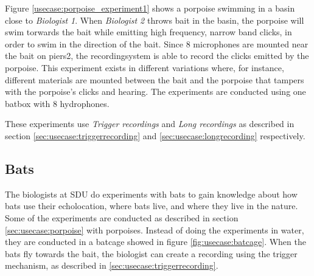 Figure \ref{usecase:porpoise_experiment1} shows a porpoise swimming in a basin close to \textit{Biologist 1}. 
When \textit{Biologist 2} throws bait in the basin, the porpoise will swim torwards the bait while emitting high frequency, narrow band clicks, in order to swim in the direction of the bait.
Since 8 microphones are mounted near the bait on piers2, the recordingsystem is able to record the clicks emitted by the porpoise. This experiment exists in different variations where, for instance, different materials are mounted between the bait and the porpoise that tampers with the porpoise's clicks and hearing. The experiments are conducted using one batbox with 8 hydrophones.


These experiments use \textit{Trigger recordings} and \textit{Long recordings} as described in section \ref{sec:usecase:triggerrecording} and \ref{sec:usecase:longrecording} respectively.

\subsection{Bats}
The biologists at SDU do experiments with bats to gain knowledge about how bats use their echolocation, where bats live, and where they live in the nature.
Some of the experiments are conducted as described in section \ref{sec:usecase:porpoise} with porpoises. Instead of doing the experiments in water, they are conducted in a batcage showed in figure \ref{fig:usecase:batcage}. When the bats fly towards the bait, the biologist can create a recording using the trigger mechanism, as described in \ref{sec:usecase:triggerrecording}.

